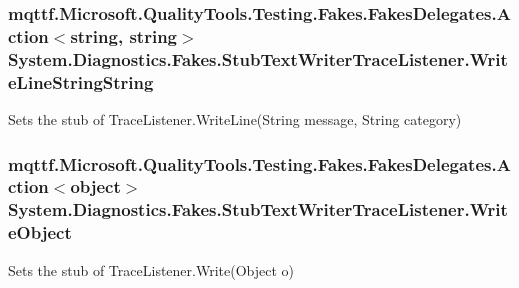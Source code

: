 \hypertarget{class_system_1_1_diagnostics_1_1_fakes_1_1_stub_text_writer_trace_listener_a9c3016ff67ffde823c22b6e128b4f4c8}{
\subsubsection[{Write\-Line\-String\-String}]{\setlength{\rightskip}{0pt plus 5cm}mqttf.\-Microsoft.\-Quality\-Tools.\-Testing.\-Fakes.\-Fakes\-Delegates.\-Action$<$string, string$>$ System.\-Diagnostics.\-Fakes.\-Stub\-Text\-Writer\-Trace\-Listener.\-Write\-Line\-String\-String}}\label{class_system_1_1_diagnostics_1_1_fakes_1_1_stub_text_writer_trace_listener_a9c3016ff67ffde823c22b6e128b4f4c8}


Sets the stub of Trace\-Listener.\-Write\-Line(\-String message, String category)

\hypertarget{class_system_1_1_diagnostics_1_1_fakes_1_1_stub_text_writer_trace_listener_af73ac3659efc7d0fd8e24b0a8c1c0264}{
\subsubsection[{Write\-Object}]{\setlength{\rightskip}{0pt plus 5cm}mqttf.\-Microsoft.\-Quality\-Tools.\-Testing.\-Fakes.\-Fakes\-Delegates.\-Action$<$object$>$ System.\-Diagnostics.\-Fakes.\-Stub\-Text\-Writer\-Trace\-Listener.\-Write\-Object}}\label{class_system_1_1_diagnostics_1_1_fakes_1_1_stub_text_writer_trace_listener_af73ac3659efc7d0fd8e24b0a8c1c0264}


Sets the stub of Trace\-Listener.\-Write(\-Object o)

